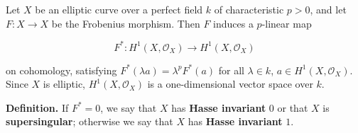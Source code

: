 Let $X$ be an elliptic curve over a perfect field $k$ of characteristic $p > 0$, and let $F: X \to X$ be the Frobenius morphism. Then $F$ induces a $p$-linear map

$$F^*: H^1(X, \mathcal{O}_X) \to H^1(X, \mathcal{O}_X)$$

on cohomology, satisfying $F^*(\lambda a) = \lambda^p F^*(a)$ for all $\lambda \in k$, $a \in H^1(X, \mathcal{O}_X)$. Since $X$ is elliptic, $H^1(X, \mathcal{O}_X)$ is a one-dimensional vector space over $k$.

\textbf{Definition.} If $F^* = 0$, we say that $X$ has \textbf{Hasse invariant} $0$ or that $X$ is \textbf{supersingular}; otherwise we say that $X$ has \textbf{Hasse invariant} $1$.
